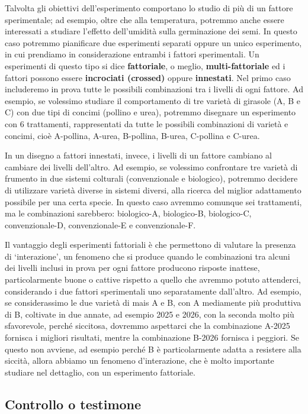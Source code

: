 \documentclass[
  12pt,
]{book}
\begin{document}
Talvolta gli obiettivi dell'esperimento comportano lo studio di più di un fattore sperimentale; ad esempio, oltre che alla temperatura, potremmo anche essere interessati a studiare l'effetto dell'umidità sulla germinazione dei semi. In questo caso potremmo pianificare due esperimenti separati oppure un unico esperimento, in cui prendiamo in considerazione entrambi i fattori sperimentali. Un esperimenti di questo tipo si dice \textbf{fattoriale}, o meglio, \textbf{multi-fattoriale} ed i fattori possono essere \textbf{incrociati (crossed)} oppure \textbf{innestati}. Nel primo caso includeremo in prova tutte le possibili combinazioni tra i livelli di ogni fattore. Ad esempio, se volessimo studiare il comportamento di tre varietà di girasole (A, B e C) con due tipi di concimi (pollino e urea), potremmo disegnare un esperimento con 6 trattamenti, rappresentati da tutte le possibili combinazioni di varietà e concimi, cioè A-pollina, A-urea, B-pollina, B-urea, C-pollina e C-urea.

In un disegno a fattori innestati, invece, i livelli di un fattore cambiano al cambiare dei livelli dell'altro. Ad esempio, se volessimo confrontare tre varietà di frumento in due sistemi colturali (convenzionale e biologico), potremmo decidere di utilizzare varietà diverse in sistemi diversi, alla ricerca del miglior adattamento possibile per una certa specie. In questo caso avremmo comunque sei trattamenti, ma le combinazioni sarebbero: biologico-A, biologico-B, biologico-C, convenzionale-D, convenzionale-E e convenzionale-F.

Il vantaggio degli esperimenti fattoriali è che permettono di valutare la presenza di `interazione', un fenomeno che si produce quando le combinazioni tra alcuni dei livelli inclusi in prova per ogni fattore producono risposte inattese, particolarmente buone o cattive rispetto a quello che avremmo potuto attenderci, considerando i due fattori sperimentali uno separatamente dall'altro. Ad esempio, se considerassimo le due varietà di mais A e B, con A mediamente più produttiva di B, coltivate in due annate, ad esempio 2025 e 2026, con la seconda molto più sfavorevole, perché siccitosa, dovremmo aspettarci che la combinazione A-2025 fornisca i migliori risultati, mentre la combinazione B-2026 fornisca i peggiori. Se questo non avviene, ad esempio perché B è particolarmente adatta a resistere alla siccità, allora abbiamo un fenomeno d'interazione, che è molto importante studiare nel dettaglio, con un esperimento fattoriale.

\hypertarget{controllo-o-testimone}{%
\subsection{Controllo o testimone}\label{controllo-o-testimone}}
\end{document}
